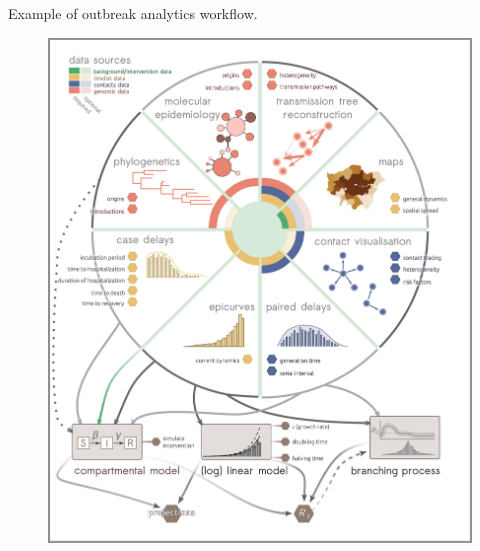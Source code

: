 \documentclass{beamer}\usepackage[]{graphicx}\usepackage[]{color}
\begin{document}
\begin{frame}[fragile]{Example of outbreak analytics workflow.}
\begin{center}
\begin{figure}
  \centering
  \includegraphics[width=\textwidth,height=0.8\textheight,keepaspectratio]{polonsky2019_Fig2.png}
\end{figure}
\end{center}
\end{frame}
\end{document}
